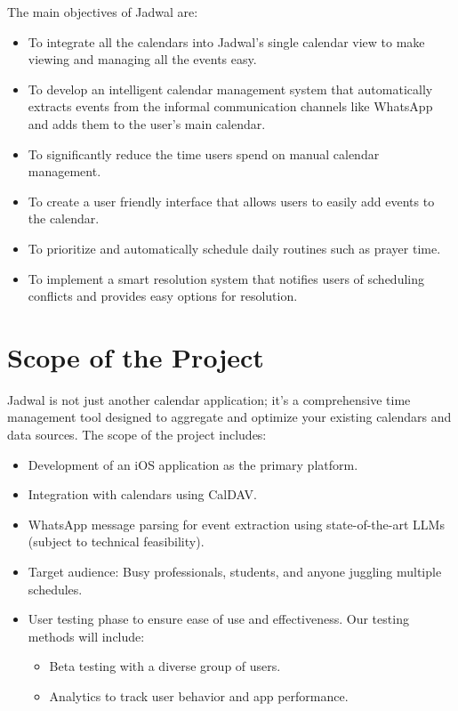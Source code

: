 \documentclass[12pt,a4paper,twoside]{report}
\begin{document}
The main objectives of Jadwal are:
\begin{itemize}

    \item To integrate all the calendars into Jadwal's single calendar view to make viewing and managing all the events easy.
    \item To develop an intelligent calendar management system that automatically extracts events from the informal communication channels like WhatsApp and adds them to the user's main calendar.
    \item To significantly reduce the time users spend on manual calendar management.
    \item To create a user friendly interface that allows users to easily add events to the calendar.
    \item To prioritize and automatically schedule daily routines such as prayer time.
    \item To implement a smart resolution system that notifies users of scheduling conflicts and provides easy options for resolution.
\end{itemize}

\section{Scope of the Project}

Jadwal is not just another calendar application; it's a comprehensive time management tool designed to aggregate and optimize your existing calendars and data sources. The scope of the project includes:
\begin{itemize}
    \item Development of an iOS application as the primary platform.
    \item Integration with calendars using CalDAV.
    \item WhatsApp message parsing for event extraction using state-of-the-art LLMs (subject to technical feasibility).
    \item Target audience: Busy professionals, students, and anyone juggling multiple schedules.
    \item User testing phase to ensure ease of use and effectiveness. Our testing methods will include:
          \begin{itemize}
              \item Beta testing with a diverse group of users.
              \item Analytics to track user behavior and app performance.
          \end{itemize}
\end{itemize}
\end{document}
